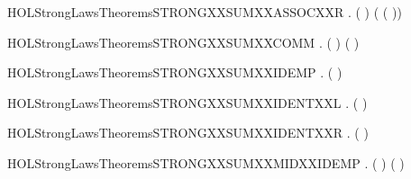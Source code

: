 \newcommand{\HOLStrongLawsTheoremsSTRONGXXSUMXXASSOCXXL}{\UseVerbatim{HOLStrongLawsTheoremsSTRONGXXSUMXXASSOCXXL}}
\begin{SaveVerbatim}{HOLStrongLawsTheoremsSTRONGXXSUMXXASSOCXXR}
\HOLTokenTurnstile{} \HOLSymConst{\HOLTokenForall{}}  .  ( \HOLSymConst{+}  \HOLSymConst{+} ) ( \HOLSymConst{+} ( \HOLSymConst{+} ))
\end{SaveVerbatim}
\newcommand{\HOLStrongLawsTheoremsSTRONGXXSUMXXASSOCXXR}{\UseVerbatim{HOLStrongLawsTheoremsSTRONGXXSUMXXASSOCXXR}}
\begin{SaveVerbatim}{HOLStrongLawsTheoremsSTRONGXXSUMXXCOMM}
\HOLTokenTurnstile{} \HOLSymConst{\HOLTokenForall{}} .  ( \HOLSymConst{+} ) ( \HOLSymConst{+} )
\end{SaveVerbatim}
\newcommand{\HOLStrongLawsTheoremsSTRONGXXSUMXXCOMM}{\UseVerbatim{HOLStrongLawsTheoremsSTRONGXXSUMXXCOMM}}
\begin{SaveVerbatim}{HOLStrongLawsTheoremsSTRONGXXSUMXXIDEMP}
\HOLTokenTurnstile{} \HOLSymConst{\HOLTokenForall{}}.  ( \HOLSymConst{+} ) 
\end{SaveVerbatim}
\newcommand{\HOLStrongLawsTheoremsSTRONGXXSUMXXIDEMP}{\UseVerbatim{HOLStrongLawsTheoremsSTRONGXXSUMXXIDEMP}}
\begin{SaveVerbatim}{HOLStrongLawsTheoremsSTRONGXXSUMXXIDENTXXL}
\HOLTokenTurnstile{} \HOLSymConst{\HOLTokenForall{}}.  ( \HOLSymConst{+} ) 
\end{SaveVerbatim}
\newcommand{\HOLStrongLawsTheoremsSTRONGXXSUMXXIDENTXXL}{\UseVerbatim{HOLStrongLawsTheoremsSTRONGXXSUMXXIDENTXXL}}
\begin{SaveVerbatim}{HOLStrongLawsTheoremsSTRONGXXSUMXXIDENTXXR}
\HOLTokenTurnstile{} \HOLSymConst{\HOLTokenForall{}}.  ( \HOLSymConst{+} ) 
\end{SaveVerbatim}
\newcommand{\HOLStrongLawsTheoremsSTRONGXXSUMXXIDENTXXR}{\UseVerbatim{HOLStrongLawsTheoremsSTRONGXXSUMXXIDENTXXR}}
\begin{SaveVerbatim}{HOLStrongLawsTheoremsSTRONGXXSUMXXMIDXXIDEMP}
\HOLTokenTurnstile{} \HOLSymConst{\HOLTokenForall{}} .  ( \HOLSymConst{+}  \HOLSymConst{+} ) ( \HOLSymConst{+} )
\end{SaveVerbatim}
